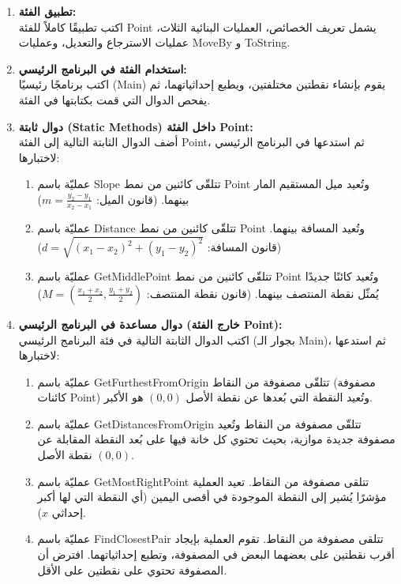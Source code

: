 \documentclass[14pt]{extarticle}
\begin{document}
\begin{enumerate}[label=\textbf{\arabic*.}]
    \item \textbf{تطبيق الفئة:} \\
    اكتب تطبيقًا كاملاً للفئة \textenglish{Point} يشمل تعريف الخصائص، العمليات البنائية الثلاث، عمليات الاسترجاع والتعديل، وعمليات \textenglish{MoveBy} و \textenglish{ToString}.

    \item \textbf{استخدام الفئة في البرنامج الرئيسي:} \\
    اكتب برنامجًا رئيسيًا (\textenglish{Main}) يقوم بإنشاء نقطتين مختلفتين، ويطبع إحداثياتهما، ثم يفحص الدوال التي قمت بكتابتها في الفئة.

    \item \textbf{دوال ثابتة (\textenglish{Static Methods}) داخل الفئة \textenglish{Point}:} \\
    أضف الدوال الثابتة التالية إلى الفئة \textenglish{Point}، ثم استدعها في البرنامج الرئيسي لاختبارها:
    \begin{enumerate}[label=\textbf{\alph*)}]
        \item عمليّة باسم \textenglish{Slope} تتلقّى كائنين من نمط \textenglish{Point} وتُعيد ميل المستقيم المار بينهما. (قانون الميل: $m = \frac{y_2 - y_1}{x_2 - x_1}$)
        \item عمليّة باسم \textenglish{Distance} تتلقّى كائنين من نمط \textenglish{Point} وتُعيد المسافة بينهما. (قانون المسافة: $d = \sqrt{(x_1 - x_2)^2 + (y_1 - y_2)^2}$)
        \item عمليّة باسم \textenglish{GetMiddlePoint} تتلقّى كائنين من نمط \textenglish{Point} وتُعيد كائنًا جديدًا يُمثّل نقطة المنتصف بينهما. (قانون نقطة المنتصف: $M = (\frac{x_1 + x_2}{2}, \frac{y_1 + y_2}{2})$)
    \end{enumerate}

    \item \textbf{دوال مساعدة في البرنامج الرئيسي (خارج الفئة \textenglish{Point}):} \\
    اكتب الدوال الثابتة التالية في فئة البرنامج الرئيسي (بجوار الـ \textenglish{Main})، ثم استدعها لاختبارها:
    \begin{enumerate}[label=\textbf{\alph*)}]
        \item عمليّة باسم \textenglish{GetFurthestFromOrigin} تتلقّى مصفوفة من النقاط (مصفوفة كائنات \textenglish{Point}) وتُعيد النقطة التي بُعدها عن نقطة الأصل $(0,0)$ هو الأكبر.
        \item عمليّة باسم \textenglish{GetDistancesFromOrigin} تتلقّى مصفوفة من النقاط وتُعيد مصفوفة جديدة موازية، بحيث تحتوي كل خانة فيها على بُعد النقطة المقابلة عن نقطة الأصل $(0,0)$.
        \item عمليّة باسم \textenglish{GetMostRightPoint} تتلقى مصفوفة من النقاط. تعيد العملية مؤشرًا يُشير إلى النقطة الموجودة في أقصى اليمين (أي النقطة التي لها أكبر إحداثي $x$).
        \item عمليّة باسم \textenglish{FindClosestPair} تتلقى مصفوفة من النقاط. تقوم العملية بإيجاد أقرب نقطتين على بعضهما البعض في المصفوفة، وتطبع إحداثياتهما. افترض أن المصفوفة تحتوي على نقطتين على الأقل.
    \end{enumerate}

\end{enumerate}
\end{document}

